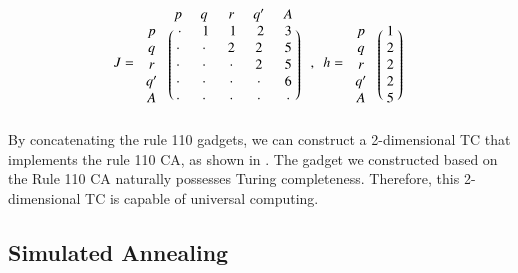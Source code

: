 \documentclass[twocolumn,superscriptaddress,english,showpacs,longbibliography]{revtex4-2}
\newcommand{\jinguo}[1]{[{\color{blue}{JGL: #1}}]}
\newcommand{\ym}[1]{[{\color{red}{YM: #1}}]}
\begin{document}
\begin{equation}
J = \begin{blockarray}{cccccc}
& p & q & r & q^\prime & A\\
\begin{block}{c(ccccc)}
p & ~\cdot~ & ~1~ & ~1~ & ~2~ & ~3~\\
q & \cdot & \cdot & 2 & 2 & 5\\
r & \cdot & \cdot & \cdot & 2 & 5\\
q^\prime & \cdot & \cdot & \cdot & \cdot & 6\\
A & \cdot & \cdot & \cdot & \cdot & \cdot\\
\end{block}
\end{blockarray}
~~, ~~h = \begin{blockarray}{cc}
& \phantom{x} \\
\begin{block}{c(c)}
p & ~1~\\
q & 2\\
r & 2\\
q^\prime & 2\\
A & 5\\
\end{block}
\end{blockarray}
\end{equation}
By concatenating the rule 110 gadgets, we can construct a 2-dimensional TC that implements the rule 110 CA, as shown in .
The gadget we constructed based on the Rule 110 CA naturally possesses Turing completeness. Therefore, this 2-dimensional TC is capable of universal computing.

\subsection{Simulated Annealing}
\end{document}
